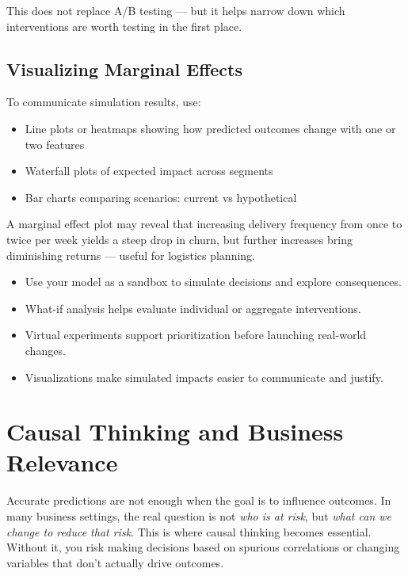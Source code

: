 \documentclass[12pt,openany]{book}
\begin{document}
\begin{notebox}
This does not replace A/B testing — but it helps narrow down which interventions are worth testing in the first place.
\end{notebox}

\section{Visualizing Marginal Effects}

To communicate simulation results, use:
\begin{itemize}
  \item Line plots or heatmaps showing how predicted outcomes change with one or two features
  \item Waterfall plots of expected impact across segments
  \item Bar charts comparing scenarios: current vs hypothetical
\end{itemize}

\begin{examplebox}
A marginal effect plot may reveal that increasing delivery frequency from once to twice per week yields a steep drop in churn, but further increases bring diminishing returns — useful for logistics planning.
\end{examplebox}

\begin{summarybox}
\begin{itemize}
  \item Use your model as a sandbox to simulate decisions and explore consequences.
  \item What-if analysis helps evaluate individual or aggregate interventions.
  \item Virtual experiments support prioritization before launching real-world changes.
  \item Visualizations make simulated impacts easier to communicate and justify.
\end{itemize}
\end{summarybox}




\chapter{Causal Thinking and Business Relevance}

Accurate predictions are not enough when the goal is to influence outcomes. In many business settings, the real question is not \textit{who is at risk}, but \textit{what can we change to reduce that risk}. This is where causal thinking becomes essential. Without it, you risk making decisions based on spurious correlations or changing variables that don't actually drive outcomes.
\end{document}
